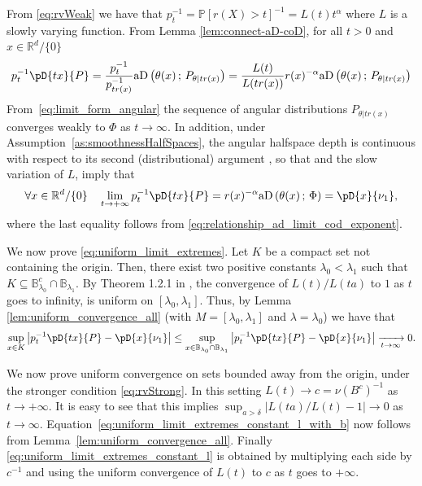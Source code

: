 \documentclass{article}
\numberwithin{equation}{section}
\newcommand{\R}{\mathbb{R}}
\renewcommand{\P}{\mathbb{P}}
\newcommand{\PP}{\P}%
\newcommand{\ball}{\mathbb{B}}
\newcommand{\coD}[2]{\pD{#1}{#2}}
\newcommand{\aD}[2]{{\mathrm{aD}}\left({#1}\,;\,{#2}\right)}
\begin{document}
%
From \eqref{eq:rvWeak} we have
that \(p_t^{-1}= \PP[r(X)>t]^{-1}=L(t)t^{\alpha}\) where \(L\) is a slowly
varying function.
From Lemma \ref{lem:connect-aD-coD},  for all \(t>0\)
and \(x\in \R^d/\{0\}\)
\begin{equation} \label{eq:cod_factorization_t}
    p_t^{-1}\coD{tx}{P}= \frac{p_t^{-1}}{p^{-1}_{tr(x)}}
    \aD{\theta(x)}{P_{\theta|tr(x)}} =
    \frac{L(t)}{L(tr(x))}r(x)^{-\alpha}\aD{\theta(x)}{P_{\theta|tr(x)}}
\end{equation}
From~\eqref{eq:limit_form_angular} the sequence of angular distributions $P_{\theta|tr(x)}$ converges weakly to $\Phi$ as $t\to \infty$. In addition, under Assumption~\ref{as:smoothnessHalfSpaces},  the
angular halfspace depth is continuous with respect to its second (distributional) argument \citep[Theorem 3]{nagy2024theoretical}, so that 
and the slow variation of \(L\), imply that
\begin{equation}\label{eq:cod_pointwise_limit}
    \forall x\in\R^d/\{0\}\quad \lim_{t\to +\infty}{p_t^{-1}\coD{tx}{P}} =
    r(x)^{-\alpha}\aD{\theta(x)}{\Phi}=\coD{x}{\nu_1},
\end{equation}
where the last equality follows from
\eqref{eq:relationship_ad_limit_cod_exponent}.

We now prove \eqref{eq:uniform_limit_extremes}.
Let  \(K\) be a compact set not containing  the origin. Then, there
exist two positive
constants \(\lambda_0<\lambda_1\) such that $K\subseteq
\ball_{\lambda_0}^c\cap \ball_{\lambda_1}$.
By Theorem 1.2.1 in \cite{Bingham1987}, the convergence of
\(L(t)/L(ta)\) to  \(1\)
as \(t\) goes to infinity, is uniform on \([\lambda_0,
\lambda_1]\). Thus, by
Lemma \ref{lem:uniform_convergence_all} (with \(M=[\lambda_0,
    \lambda_1]\) and
\(\lambda=\lambda_0\)) we have that
\begin{equation*}
    \sup_{x\in K} \left| p_t^{-1}\coD{tx}{P} -
    \coD{x}{\nu_1} \right|\leq \sup_{x\in \ball_{\lambda_0}\cap
    \ball_{\lambda_1}} \left| p_t^{-1}\coD{tx}{P} -
    \coD{x}{\nu_1} \right|\xrightarrow[t\to\infty]{} 0.
\end{equation*}

We now prove uniform convergence on sets bounded away from the
origin, under the stronger condition \eqref{eq:rvStrong}. In this
setting $L(t)\to c=\nu(B^c)^{-1}$ as
\(t\to +\infty\). It is easy to see that this implies
$\sup_{a>\delta} | L(ta)/L(t) -1| \to 0$ as $t\to\infty$. %
Equation~\eqref{eq:uniform_limit_extremes_constant_l_with_b}
now follows from Lemma~\ref{lem:uniform_convergence_all}. Finally
\eqref{eq:uniform_limit_extremes_constant_l} is obtained by
multiplying each side by $c^{-1}$ and using the uniform convergence
of \(L(t)\) to \(c\) as \(t\) goes to \(+\infty\).
\end{document}
